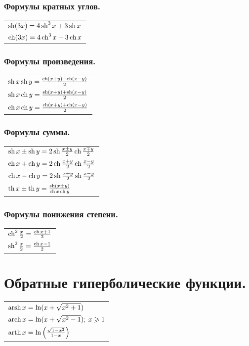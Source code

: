\subsubsection{Формулы кратных углов.}
\begin{tabular}{l}
$\sh (3x) = 4\sh^3 x + 3 \sh x$
\\
$\ch (3x) = 4 \ch^3 x - 3 \ch x$
\end{tabular}
\subsubsection{Формулы произведения.}
\begin{tabular}{l}
$\sh x \sh y = \frac{\ch(x + y) - \ch (x - y)}{2}$
\\
$\sh x \ch y = \frac{\sh(x + y) + \sh(x - y)}{2}$
\\
$\ch x \ch y = \frac{\ch(x + y) + \ch(x - y)}{2}$
\end{tabular}
\subsubsection{Формулы суммы.}
\begin{tabular}{l}
$\sh x \pm \sh y = 2 \sh\frac{x \pm y}{2} \ch\frac{x \mp y}{2}$
\\
$\ch x + \ch y = 2 \ch\frac{x + y}{2}\ch\frac{x - y}{2}$
\\
$\ch x - \ch y = 2 \sh\frac{x + y}{2}\sh\frac{x - y}{2}$
\\
$\th x \pm \th y = \frac{\sh(x \pm y)}{\ch x \ch y}$
\end{tabular}
\subsubsection{Формулы понижения степени.}
\begin{tabular}{l}
$\ch^2 \frac{x}{2} = \frac{\ch x + 1}{2}$
\\
$\sh^2 \frac{x}{2} = \frac{\ch x - 1}{2}$
\end{tabular}
\section{Обратные гиперболические функции.}
\begin{tabular}{l}
$\arsh x = \ln(x + \sqrt{x^2 + 1})$
\\
$\arch x = \ln(x + \sqrt{x^2 - 1}); \: x \ge 1$
\\
$\arth x = \ln \left(\frac{\sqrt{1 - x^2}}{1 - x} \right)$
\\
\end{tabular}


